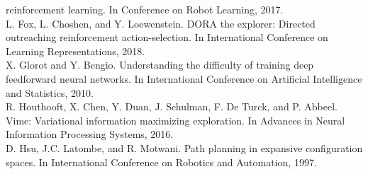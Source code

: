 \documentclass{article}
\newcounter{n}
\begin{document}
reinforcement learning. In Conference on Robot Learning, 2017.\\
L. Fox, L. Choshen, and Y. Loewenstein. DORA the explorer: Directed outreaching reinforcement
action-selection. In International Conference on Learning Representations, 2018.\\
X. Glorot and Y. Bengio. Understanding the difficulty of training deep feedforward neural networks.
In International Conference on Artificial Intelligence and Statistics, 2010.\\
R. Houthooft, X. Chen, Y. Duan, J. Schulman, F. De Turck, and P. Abbeel. Vime: Variational
information maximizing exploration. In Advances in Neural Information Processing Systems,
2016.\\
D. Hsu, J.C. Latombe, and R. Motwani. Path planning in expansive configuration spaces. In
International Conference on Robotics and Automation, 1997. \\
\end{document}
